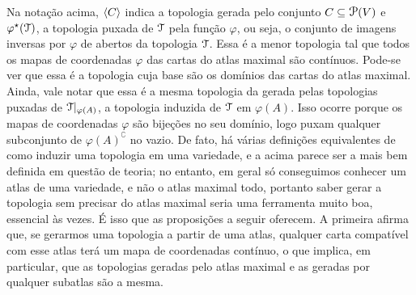 Na notação acima, $\left\langle C \right\rangle$ indica a topologia gerada pelo conjunto $C \subseteq \p(V)$ e $\varphi^\star(\mathcal{T})$, a topologia puxada de $\mathcal{T}$ pela função $\varphi$, ou seja, o conjunto de imagens inversas por $\varphi$ de abertos da topologia $\mathcal{T}$. Essa é a menor topologia tal que todos os mapas de coordenadas $\varphi$ das cartas do atlas maximal são contínuos. Pode-se ver que essa é a topologia cuja base são os domínios das cartas do atlas maximal. Ainda, vale notar que essa é a mesma topologia da gerada pelas topologias puxadas de $\mathcal{T}|_{\varphi(A)}$, a topologia induzida de $\mathcal{T}$ em $\varphi(A)$. Isso ocorre porque os mapas de coordenadas $\varphi$ são bijeções no seu domínio, logo puxam qualquer subconjunto de $\varphi(A)^\complement$ no vazio. De fato, há várias definições equivalentes de como induzir uma topologia em uma variedade, e a acima parece ser a mais bem definida em questão de teoria; no entanto, em geral só conseguimos conhecer um atlas de uma variedade, e não o atlas maximal todo, portanto saber gerar a topologia sem precisar do atlas maximal seria uma ferramenta muito boa, essencial às vezes. É isso que as proposições a seguir oferecem. A primeira afirma que, se gerarmos uma topologia a partir de uma atlas, qualquer carta compatível com esse atlas terá um mapa de coordenadas contínuo, o que implica, em particular, que as topologias geradas pelo atlas maximal e as geradas por qualquer subatlas são a mesma.

